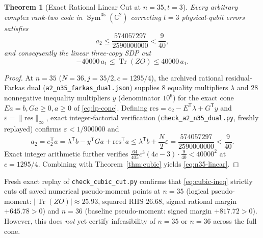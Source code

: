 \documentclass[11pt,letterpaper]{article}
\newtheorem{theorem}{Theorem}[section]
\theoremstyle{definition}
\theoremstyle{remark}
\newcommand{\Tr}{\operatorname{Tr}}
\newcommand{\Sym}{\operatorname{Sym}}
\newcommand{\C}{\mathbb{C}}
\begin{document}
\begin{theorem}[Exact Rational Linear Cut at $n=35, t=3$]\label{thm:n35-cut}
Every arbitrary complex rank-two code in $\Sym^{35}(\C^2)$ correcting $t=3$ physical-qubit errors satisfies
\begin{equation}\label{eq:n35-a2}
  a_2 \le \frac{574057297}{2590000000} < \frac{9}{40},
\end{equation}
and consequently the linear three-copy SDP cut
\begin{equation}\label{eq:n35-linear}
  -40000\,a_1 \le \Tr(ZO) \le 40000\,a_1.
\end{equation}
\end{theorem}
\begin{proof}
At $n=35$ ($N=36, j=35/2, c=1295/4$), the archived rational residual-Farkas dual (\texttt{a2\_n35\_farkas\_dual.json}) supplies 8 equality multipliers $\lambda$ and 28 nonnegative inequality multipliers $y$ (denominator $10^6$) for the exact cone $Ea=b, Ga \ge 0, a \ge 0$ of \eqref{eq:lp-cone}. Defining $\mathrm{res} = e_2 - E^{\mathsf T}\lambda + G^{\mathsf T}y$ and $\varepsilon = \|\mathrm{res}\|_\infty$, exact integer-factorial verification (\texttt{check\_a2\_n35\_dual.py}, freshly replayed) confirms $\varepsilon < 1/900000$ and
\[
  a_2 = e_2^{\mathsf T}a = \lambda^{\mathsf T}b - y^{\mathsf T}Ga + \mathrm{res}^{\mathsf T}a \le \lambda^{\mathsf T}b + \frac{N}{2}\varepsilon = \frac{574057297}{2590000000} < \frac{9}{40}.
\]
Exact integer arithmetic further verifies $\frac{64}{405} c^3(4c-3)\cdot \frac{9}{40} < 40000^2$ at $c=1295/4$. Combining with Theorem~\ref{thm:cubic} yields \eqref{eq:n35-linear}.
\end{proof}

Fresh exact replay of \texttt{check\_cubic\_cut.py} confirms that \eqref{eq:cubic-ineq} strictly cuts off saved numerical pseudo-moment points at $n=35$ (logical pseudo-moment: $|\Tr(ZO)| \approx 25.93$, squared RHS $26.68$, signed rational margin $+645.78 > 0$) and $n=36$ (baseline pseudo-moment: signed margin $+817.72 > 0$). However, this does \emph{not} yet certify infeasibility of $n=35$ or $n=36$ across the full cone.
\end{document}
